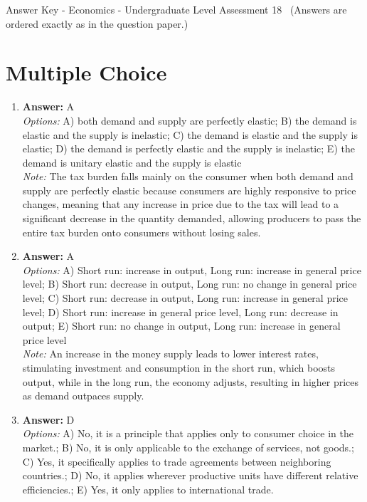 \documentclass[12pt]{article}
\begin{document}
\begin{center}
Answer Key - Economics - Undergraduate Level Assessment 18 \
\small (Answers are ordered exactly as in the question paper.)
\end{center}

\section*{Multiple Choice}
\begin{enumerate}[label=\arabic*.]
\item \textbf{Answer:} A
\\ \textit{Options:} A) both demand and supply are perfectly elastic; B) the demand is elastic and the supply is inelastic; C) the demand is elastic and the supply is elastic; D) the demand is perfectly elastic and the supply is inelastic; E) the demand is unitary elastic and the supply is elastic
\\ \textit{Note:} The tax burden falls mainly on the consumer when both demand and supply are perfectly elastic because consumers are highly responsive to price changes, meaning that any increase in price due to the tax will lead to a significant decrease in the quantity demanded, allowing producers to pass the entire tax burden onto consumers without losing sales.
\item \textbf{Answer:} A
\\ \textit{Options:} A) Short run: increase in output, Long run: increase in general price level; B) Short run: decrease in output, Long run: no change in general price level; C) Short run: decrease in output, Long run: increase in general price level; D) Short run: increase in general price level, Long run: decrease in output; E) Short run: no change in output, Long run: increase in general price level
\\ \textit{Note:} An increase in the money supply leads to lower interest rates, stimulating investment and consumption in the short run, which boosts output, while in the long run, the economy adjusts, resulting in higher prices as demand outpaces supply.
\item \textbf{Answer:} D
\\ \textit{Options:} A) No, it is a principle that applies only to consumer choice in the market.; B) No, it is only applicable to the exchange of services, not goods.; C) Yes, it specifically applies to trade agreements between neighboring countries.; D) No, it applies wherever productive units have different relative efficiencies.; E) Yes, it only applies to international trade.

\end{enumerate}
\end{document}
